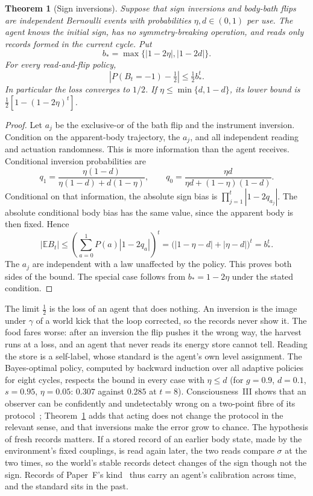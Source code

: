 \documentclass[12pt]{article}
\newtheorem{theorem}{Theorem}
\theoremstyle{definition}
\newcommand{\E}{\mathbb E}
\begin{document}
\begin{theorem}[Sign inversions]
\label{thm:inversion}
Suppose that sign inversions and body-bath flips are independent Bernoulli
events with probabilities $\eta,d\in(0,1)$ per use. The agent knows the initial
sign, has no symmetry-breaking operation, and reads only records formed in
the current cycle. Put
\[
 b_* = \max\{|1-2\eta|,|1-2d|\}.
\]
For every read-and-flip policy,
\[
 \left|P(B_t=-1)-\tfrac12\right|\le\tfrac12 b_*^t.
\]
In particular the loss converges to $1/2$. If
$\eta\le\min\{d,1-d\}$, its lower bound is
$\tfrac12[1-(1-2\eta)^t]$.
\end{theorem}
\begin{proof}
Let $a_j$ be the exclusive-or of the bath flip and the instrument inversion.
Condition on the apparent-body trajectory, the $a_j$, and all independent
reading and actuation randomness. This is more information than the agent
receives. Conditional inversion probabilities are
\[
 q_1=\frac{\eta(1-d)}{\eta(1-d)+d(1-\eta)},\qquad
 q_0=\frac{\eta d}{\eta d+(1-\eta)(1-d)}.
\]
Conditional on that information, the absolute sign bias is
$\prod_{j=1}^t|1-2q_{a_j}|$. The absolute conditional body bias has the same
value, since the apparent body is then fixed. Hence
\[
 |\E B_t|\le
 \left(\sum_{a=0}^1P(a)|1-2q_a|\right)^t
 =\bigl(|1-\eta-d|+|\eta-d|\bigr)^t=b_*^t.
\]
The $a_j$ are independent with a law unaffected by the policy. This proves
both sides of the bound. The special case follows from
$b_*=1-2\eta$ under the stated condition.
\end{proof}

The limit $\tfrac12$ is the loss of an agent that does nothing. An inversion is the image under $\gamma$ of a world kick that the loop corrected, so the records never show it. The food fares worse: after an inversion the flip pushes it the wrong way, the harvest runs at a loss, and an agent that never reads its energy store cannot tell. Reading the store is a self-label, whose standard is the agent's own level assignment. The Bayes-optimal policy, computed by backward induction over all adaptive policies for eight cycles, respects the bound in every case with $\eta\le d$ (for $g=0.9$, $d=0.1$, $s=0.95$, $\eta=0.05$: $0.307$ against $0.285$ at $t=8$). Consciousness~III shows that an observer can be confidently and undetectably wrong on a two-point fibre of its protocol~\cite{Liu2026CIII}; Theorem~\ref{thm:inversion} adds that acting does not change the protocol in the relevant sense, and that inversions make the error grow to chance. The hypothesis of fresh records matters. If a stored record of an earlier body state, made by the environment's fixed couplings, is read again later, the two reads compare $\sigma$ at the two times, so the world's stable records detect changes of the sign though not the sign. Records of Paper~F's kind~\cite{Liu2026HAFF_F} thus carry an agent's calibration across time, and the standard sits in the past.
\end{document}
